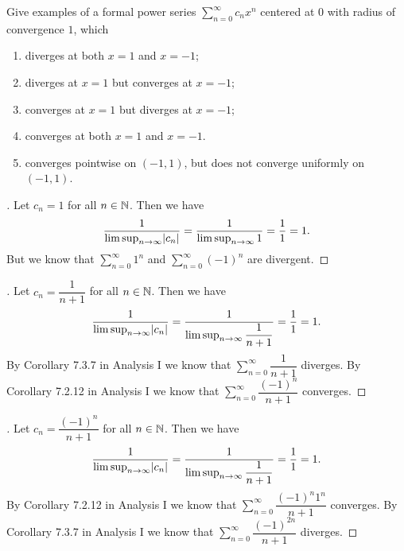 \begin{ex}\label{ii:ex:4.1.2}
  Give examples of a formal power series \(\sum_{n = 0}^\infty c_n x^n\) centered at \(0\) with radius of convergence \(1\), which
  \begin{enumerate}
    \item\label{ii:ex:4.1.2.a} diverges at both \(x = 1\) and \(x = -1\);
    \item\label{ii:ex:4.1.2.b} diverges at \(x = 1\) but converges at \(x = -1\);
    \item\label{ii:ex:4.1.2.c} converges at \(x = 1\) but diverges at \(x = -1\);
    \item\label{ii:ex:4.1.2.d} converges at both \(x = 1\) and \(x = -1\).
    \item\label{ii:ex:4.1.2.e} converges pointwise on \((-1, 1)\), but does not converge uniformly on \((-1, 1)\).
  \end{enumerate}
\end{ex}

\begin{proof}[]
  Let \(c_n = 1\) for all \(n \in \mathbb{N}\).
  Then we have
  \[
    \dfrac{1}{\limsup_{n \to \infty} \abs{c_n}} = \dfrac{1}{\limsup_{n \to \infty} 1} = \dfrac{1}{1} = 1.
  \]
  But we know that \(\sum_{n = 0}^\infty 1^n\) and \(\sum_{n = 0}^\infty (-1)^n\) are divergent.
\end{proof}

\begin{proof}[]
  Let \(c_n = \dfrac{1}{n + 1}\) for all \(n \in \mathbb{N}\).
  Then we have
  \[
    \dfrac{1}{\limsup_{n \to \infty} \abs{c_n}} = \dfrac{1}{\limsup_{n \to \infty} \dfrac{1}{n + 1}} = \dfrac{1}{1} = 1.
  \]
  By Corollary 7.3.7 in Analysis I we know that \(\sum_{n = 0}^\infty \dfrac{1}{n + 1}\) diverges.
  By Corollary 7.2.12 in Analysis I we know that \(\sum_{n = 0}^\infty \dfrac{(-1)^n}{n + 1}\) converges.
\end{proof}

\begin{proof}[]
  Let \(c_n = \dfrac{(-1)^n}{n + 1}\) for all \(n \in \mathbb{N}\).
  Then we have
  \[
    \dfrac{1}{\limsup_{n \to \infty} \abs{c_n}} = \dfrac{1}{\limsup_{n \to \infty} \dfrac{1}{n + 1}} = \dfrac{1}{1} = 1.
  \]
  By Corollary 7.2.12 in Analysis I we know that \(\sum_{n = 0}^\infty \dfrac{(-1)^n 1^n}{n + 1}\) converges.
  By Corollary 7.3.7 in Analysis I we know that \(\sum_{n = 0}^\infty \dfrac{(-1)^{2n}}{n + 1}\) diverges.
\end{proof}

